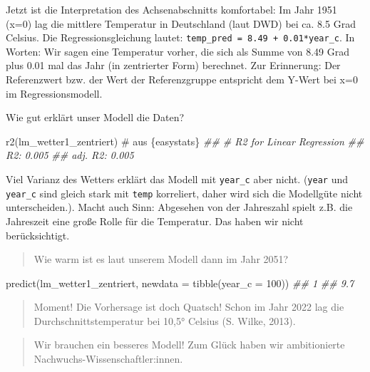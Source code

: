 \documentclass[
  letterpaper,
  twoside,
  open=any]{scrbook}
\newenvironment{Shaded}{\begin{snugshade}}{\end{snugshade}}
\newcommand{\AttributeTok}[1]{\textcolor[rgb]{0.40,0.45,0.13}{#1}}
\newcommand{\CommentTok}[1]{\textcolor[rgb]{0.37,0.37,0.37}{#1}}
\newcommand{\DecValTok}[1]{\textcolor[rgb]{0.68,0.00,0.00}{#1}}
\newcommand{\DocumentationTok}[1]{\textcolor[rgb]{0.37,0.37,0.37}{\textit{#1}}}
\newcommand{\FunctionTok}[1]{\textcolor[rgb]{0.28,0.35,0.67}{#1}}
\newcommand{\NormalTok}[1]{\textcolor[rgb]{0.00,0.23,0.31}{#1}}
\theoremstyle{definition}
\theoremstyle{definition}
\theoremstyle{definition}
\theoremstyle{remark}
\begin{document}
Jetzt ist die Interpretation des Achsenabschnitts komfortabel: Im Jahr
1951 (x=0) lag die mittlere Temperatur in Deutschland (laut DWD) bei ca.
8.5 Grad Celsius. Die Regressionsgleichung lautet:
\texttt{temp\_pred\ =\ 8.49\ +\ 0.01*year\_c}. In Worten: Wir sagen eine
Temperatur vorher, die sich als Summe von 8.49 Grad plus 0.01 mal das
Jahr (in zentrierter Form) berechnet. Zur Erinnerung: Der Referenzwert
bzw. der Wert der Referenzgruppe entspricht dem Y-Wert bei x=0 im
Regressionsmodell.

Wie gut erklärt unser Modell die Daten?

\begin{Shaded}
\begin{Highlighting}[]
\FunctionTok{r2}\NormalTok{(lm\_wetter1\_zentriert)  }\CommentTok{\# aus \textasciigrave{}\{easystats\}\textasciigrave{}}
\DocumentationTok{\#\# \# R2 for Linear Regression}
\DocumentationTok{\#\#        R2: 0.005}
\DocumentationTok{\#\#   adj. R2: 0.005}
\end{Highlighting}
\end{Shaded}

Viel Varianz des Wetters erklärt das Modell mit \texttt{year\_c} aber
nicht. (\texttt{year} und \texttt{year\_c} sind gleich stark mit
\texttt{temp} korreliert, daher wird sich die Modellgüte nicht
unterscheiden.). Macht auch Sinn: Abgesehen von der Jahreszahl spielt
z.B. die Jahreszeit eine große Rolle für die Temperatur. Das haben wir
nicht berücksichtigt.

\begin{quote}
{} Wie warm ist es laut unserem Modell dann im Jahr 2051?
\end{quote}

\begin{Shaded}
\begin{Highlighting}[]
\FunctionTok{predict}\NormalTok{(lm\_wetter1\_zentriert, }\AttributeTok{newdata =} \FunctionTok{tibble}\NormalTok{(}\AttributeTok{year\_c =} \DecValTok{100}\NormalTok{))}
\DocumentationTok{\#\#   1 }
\DocumentationTok{\#\# 9.7}
\end{Highlighting}
\end{Shaded}

\begin{quote}
{} Moment! Die Vorhersage ist doch Quatsch! Schon im Jahr
2022 lag die Durchschnittstemperatur bei 10,5° Celsius (S. Wilke, 2013).
\end{quote}

\begin{quote}
{} Wir brauchen ein besseres Modell! Zum Glück haben wir
ambitionierte Nachwuchs-Wissenschaftler:innen.
\end{quote}
\end{document}
